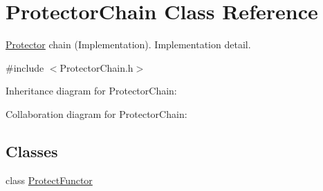 \hypertarget{class_protector_chain}{\section{Protector\+Chain Class Reference}
\label{class_protector_chain}
}


\hyperlink{class_protector}{Protector} chain (Implementation). Implementation detail.  




{\ttfamily \#include $<$Protector\+Chain.\+h$>$}



Inheritance diagram for Protector\+Chain\+:


Collaboration diagram for Protector\+Chain\+:
\subsection*{Classes}
\begin{DoxyCompactItemize}
\item 
class \hyperlink{class_protector_chain_1_1_protect_functor}{Protect\+Functor}
\end{DoxyCompactItemize}
